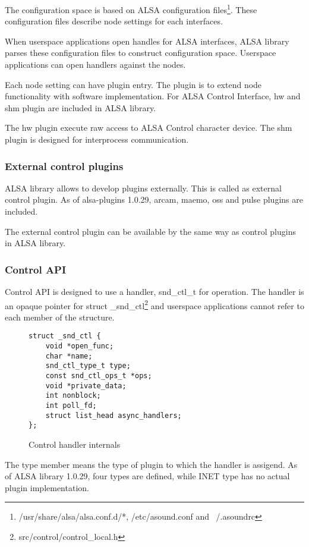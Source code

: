 \documentclass[onecolumn]{article}
\begin{document}
The configuration space is based on ALSA configuration files\footnote{/usr/share/alsa/alsa.conf.d/*, /etc/asound.conf and ~/.asoundrc}. These configuration files describe node settings for each interfaces.

When userspace applications open handles for ALSA interfaces, ALSA library parses these configuration files to construct configuration space. Userspace applications can open handlers against the nodes.

Each node setting can have plugin entry. The plugin is to extend node functionality with software implementation. For ALSA Control Interface, hw and shm plugin are included in ALSA library.

The hw plugin execute raw access to ALSA Control character device. The shm plugin is designed for interprocess communication.


\subsubsection{External control plugins}

ALSA library allows to develop plugins externally. This is called as external control plugin. As of alsa-plugins 1.0.29, arcam, maemo, oss and pulse plugins are included.

The external control plugin can be available by the same way as control plugins in ALSA library.


\subsubsection{Control API}

Control API is designed to use a handler, snd\_ctl\_t for operation. The handler is an opaque pointer for struct \_snd\_ctl\footnote{src/control/control\_local.h} and userspace applications cannot refer to each member of the structure.

\begin{figure}[htbp]
\small
\begin{verbatim}
struct _snd_ctl {
    void *open_func;
    char *name;
    snd_ctl_type_t type;
    const snd_ctl_ops_t *ops;
    void *private_data;
    int nonblock;
    int poll_fd;
    struct list_head async_handlers;
};
\end{verbatim}
\caption{{Control handler internals}}
\label{control-handler-internals}
\end{figure}

The type member means the type of plugin to which the handler is assigend. As of ALSA library 1.0.29, four types are defined, while INET type has no actual plugin implementation.
\end{document}
